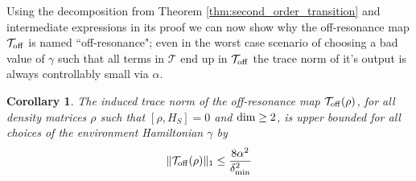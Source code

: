\documentclass{article}
\newtheorem{corollary}[theorem]{Corollary}
\newcommand{\off}{\rm off}
\newcommand{\norm}[1]{\| #1 \|}
\begin{document}
Using the decomposition from Theorem \ref{thm:second_order_transition} and intermediate expressions in its proof we can now show why the off-resonance map $\mathcal{T}_{\off}$ is named ``off-resonance"; even in the worst case scenario of choosing a bad value of $\gamma$ such that all terms in $\mathcal{T}$ end up in $\mathcal{T}_{\off}$ the trace norm of it's output is always controllably small via $\alpha$.
\begin{corollary} \label{cor:t_off_norm}
    The induced trace norm of the off-resonance map $\mathcal{T}_{\off}(\rho)$, for all density matrices $\rho$ such that $[\rho, H_S] = 0$ and $\rm{dim}\ge 2$, is upper bounded for all choices of the environment Hamiltonian $\gamma$ by
    \begin{align}
        \norm{\mathcal{T}_{\off}(\rho)}_1 \le \frac{8 \alpha^2}{\delta_{\min}^2}
    \end{align}
\end{corollary}
\end{document}
